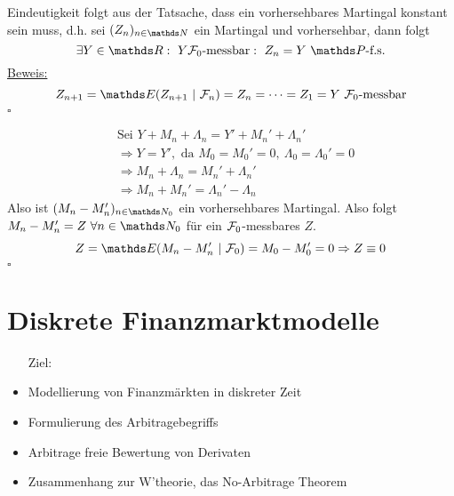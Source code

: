 Eindeutigkeit folgt aus der Tatsache, dass ein vorhersehbares Martingal konstant sein muss, d.h. sei $(Z_n)_{n\in\N}$ ein Martingal und vorhersehbar, dann folgt 
\[
\exists Y\in\R:~Y \F_0\text{-messbar}:~Z_n=Y~\Pw\text{-f.s.}
\]
\uline{Beweis:} 
\[
Z_{n+1}=\E(Z_{n+1}~|~\F_n)=Z_n=\dots=Z_1=Y ~ \F_0\text{-messbar} 
\] 
\hfill $\square$

\begin{equation*}
\begin{aligned}
	&\text{Sei } Y+M_n+\Lambda_n=Y'+M_n'+\Lambda_n'\\
	&\Rightarrow Y=Y', \text{ da } M_0=M_0'=0,~ \Lambda_0=\Lambda_0'=0\\
	&\Rightarrow M_n+\Lambda_n=M_n'+\Lambda_n'\\
	&\Rightarrow M_n+M_n'=\Lambda_n'-\Lambda_n
\end{aligned}
\end{equation*}
Also ist $(M_n-M_n')_{n\in \N_0}$ ein vorhersehbares Martingal. Also folgt $M_n-M_n'=Z~\forall n\in \N_0$ für ein $\mathcal{F}_0$-messbares $Z$.
\[
Z=\E(M_n-M_n'~|~\F_0)=M_0-M_0'=0 \Rightarrow Z\equiv 0 
\]
\hfill $\square$


\section{Diskrete Finanzmarktmodelle}
\label{sec:disk_finanzmarktmodelle}
\begin{itemize}
	\item[Ziel:]
	\item Modellierung von Finanzmärkten in diskreter Zeit
	\item Formulierung des Arbitragebegriffs
	\item Arbitrage freie Bewertung von Derivaten
	\item Zusammenhang zur W'theorie, das No-Arbitrage Theorem
\end{itemize}

